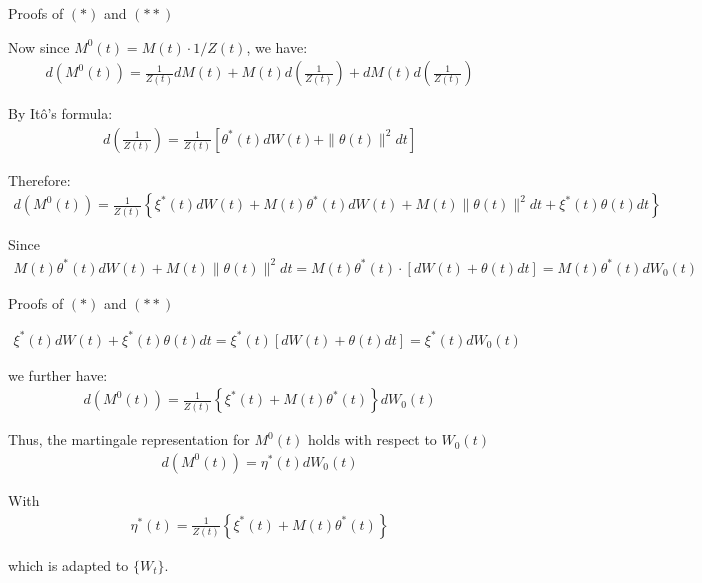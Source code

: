 \documentclass{beamer}
\begin{document}
\begin{frame}{Proofs of $(*)$ and $(**)$}

    {\footnotesize \footnotesize
   
    \par Now since \( M^0(t) = M(t) \cdot 1/Z(t) \), we have:
    \begin{align*}
        d(M^0(t)) = \frac{1}{Z(t)} dM(t) + M(t) d\left(\frac{1}{Z(t)}\right) + dM(t) d\left(\frac{1}{Z(t)}\right)
    \end{align*}
    \par By Itô's formula:
    \begin{align*}
        d \left( \frac{1}{Z(t)} \right) =  \frac{1}{Z(t)} \left[ \theta^*(t) dW(t) + \| \theta(t) \|^2 dt \right]
    \end{align*}
     \par  \pause Therefore:
    \begin{align*}
        d(M^0(t)) = \frac{1}{Z(t)} \left\{ \xi^*(t) dW(t) + M(t) \theta^*(t) dW(t) + M(t) \| \theta(t) \|^2 dt + \xi^*(t) \theta(t) dt \right\}
    \end{align*}
    \par Since
    \begin{align*}
        M(t) \theta^*(t) dW(t) + M(t) \| \theta(t) \|^2 dt = M(t) \theta^*(t) \cdot [dW(t) + \theta(t) dt] = M(t) \theta^*(t) dW_0(t)
    \end{align*}
    }

\end{frame}

\begin{frame}{Proofs of $(*)$ and $(**)$}

    {\footnotesize \footnotesize
   \begin{align*}
    \xi^*(t)dW(t) + \xi^*(t)\theta(t)dt = \xi^*(t)[dW(t) + \theta(t)dt] = \xi^*(t)dW_0(t)
   \end{align*}
   \par we further have:
   \begin{align*}
    d(M^0(t)) = \frac{1}{Z(t)} \left\{ \xi^*(t) + M(t)\theta^*(t) \right\} dW_0(t)
   \end{align*}
   \par  \pause Thus, the martingale representation for \(M^0(t)\) holds with respect to \(W_0(t)\)
   \begin{align*}
    d(M^0(t)) = \eta^*(t)dW_0(t)
   \end{align*}
   \par With 
   \begin{align*}
    \eta^*(t) = \frac{1}{Z(t)} \left\{ \xi^*(t) + M(t)\theta^*(t) \right\}
   \end{align*}
   \par which is adapted to \(\{W_t\}\).
    }

\end{frame}
\end{document}
